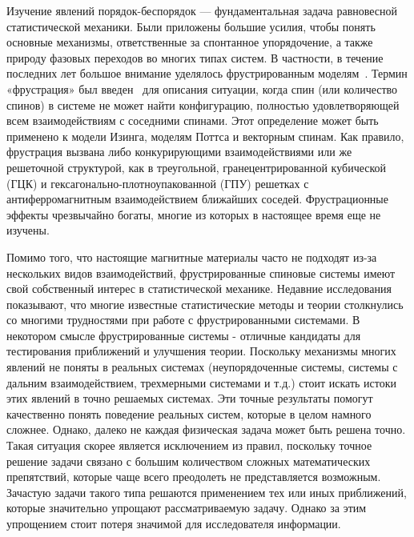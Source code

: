 
Изучение явлений порядок-беспорядок --- фундаментальная задача равновесной статистической механики. Были приложены большие усилия, чтобы понять основные механизмы, ответственные за спонтанное упорядочение, а также природу фазовых переходов во многих типах систем. В частности, в течение последних лет большое внимание уделялось фрустрированным моделям~\cite{liebmann1986}. Термин «фрустрация» был введен~\cite{toulouse1977,vannimenus1977} для описания ситуации, когда спин (или количество спинов) в системе не может найти конфигурацию, полностью удовлетворяющей всем взаимодействиям с соседними спинами. Этот определение может быть применено к модели Изинга, моделям Поттса и векторным спинам. Как правило, фрустрация вызвана либо конкурирующими взаимодействиями или же решеточной структурой, как в треугольной, гранецентрированной кубической (ГЦК) и гексагонально-плотноупакованной (ГПУ) решетках с антиферромагнитным взаимодействием ближайших соседей. Фрустрационные эффекты чрезвычайно богаты, многие из которых в настоящее время еще не изучены.

Помимо того, что настоящие магнитные материалы часто не подходят из-за нескольких видов взаимодействий, фрустрированные спиновые системы имеют свой собственный интерес в статистической механике. Недавние исследования показывают, что многие известные статистические методы и теории столкнулись со многими трудностями при работе с фрустрированными системами. В некотором смысле фрустрированные системы - отличные кандидаты для тестирования приближений и улучшения теории. Поскольку механизмы многих явлений не поняты в реальных системах (неупорядоченные системы, системы с дальним взаимодействием, трехмерными системами и т.д.) стоит искать истоки этих явлений в точно решаемых системах. Эти точные результаты помогут качественно понять поведение реальных систем, которые в целом намного сложнее.
Однако, далеко не каждая физическая задача может быть решена точно. Такая ситуация скорее является исключением из правил, поскольку точное решение задачи связано с большим количеством сложных математических препятствий, которые чаще всего преодолеть не представляется возможным. Зачастую задачи такого типа решаются применением тех или иных приближений, которые значительно упрощают рассматриваемую задачу. Однако за этим упрощением стоит потеря значимой для исследователя информации.

